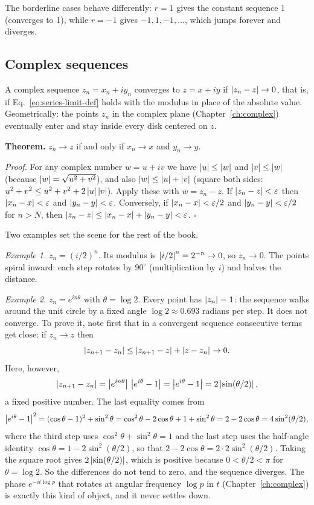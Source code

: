 The borderline cases behave differently: $r=1$ gives the constant sequence $1$ (converges to 1), while $r=-1$ gives $-1,1,-1,\dots$, which jumps forever and diverges.

\subsection{Complex sequences}

A complex sequence $z_n=x_n+iy_n$ converges to $z=x+iy$ if $\left\lvert z_n-z\right\rvert\to0$, that is, if Eq.~\eqref{eq:series-limit-def} holds with the modulus in place of the absolute value. Geometrically: the points $z_n$ in the complex plane (Chapter~\ref{ch:complex}) eventually enter and stay inside every disk centered on $z$.

\textbf{Theorem.} $z_n\to z$ if and only if $x_n\to x$ and $y_n\to y$.

\emph{Proof.} For any complex number $w=u+iv$ we have $\left\lvert u\right\rvert\le\left\lvert w\right\rvert$ and $\left\lvert v\right\rvert\le\left\lvert w\right\rvert$ (because $\left\lvert w\right\rvert=\sqrt{u^2+v^2}$), and also $\left\lvert w\right\rvert\le\left\lvert u\right\rvert+\left\lvert v\right\rvert$ (square both sides: $u^2+v^2\le u^2+v^2+2\left\lvert u\right\rvert\left\lvert v\right\rvert$). Apply these with $w=z_n-z$. If $\left\lvert z_n-z\right\rvert<\varepsilon$ then $\left\lvert x_n-x\right\rvert<\varepsilon$ and $\left\lvert y_n-y\right\rvert<\varepsilon$. Conversely, if $\left\lvert x_n-x\right\rvert<\varepsilon/2$ and $\left\lvert y_n-y\right\rvert<\varepsilon/2$ for $n>N$, then $\left\lvert z_n-z\right\rvert\le\left\lvert x_n-x\right\rvert+\left\lvert y_n-y\right\rvert<\varepsilon$. $\square$

Two examples set the scene for the rest of the book.

\emph{Example 1.} $z_n=(i/2)^n$. Its modulus is $\left\lvert i/2\right\rvert^n=2^{-n}\to0$, so $z_n\to0$. The points spiral inward: each step rotates by $90^\circ$ (multiplication by $i$) and halves the distance.

\emph{Example 2.} $z_n=e^{in\theta}$ with $\theta=\log2$. Every point has $\left\lvert z_n\right\rvert=1$: the sequence walks around the unit circle by a fixed angle $\log 2\approx0.693$ radians per step. It does not converge. To prove it, note first that in a convergent sequence consecutive terms get close: if $z_n\to z$ then
\[
\left\lvert z_{n+1}-z_n\right\rvert\le\left\lvert z_{n+1}-z\right\rvert+\left\lvert z-z_n\right\rvert\to0 .
\]
Here, however,
\[
\left\lvert z_{n+1}-z_n\right\rvert=\left\lvert e^{in\theta}\right\rvert\,\left\lvert e^{i\theta}-1\right\rvert=\left\lvert e^{i\theta}-1\right\rvert=2\left\lvert \sin(\theta/2)\right\rvert,
\]
a fixed positive number. The last equality comes from
\[
\left\lvert e^{i\theta}-1\right\rvert^2=(\cos\theta-1)^2+\sin^2\theta=\cos^2\theta-2\cos\theta+1+\sin^2\theta=2-2\cos\theta=4\sin^2(\theta/2),
\]
where the third step uses $\cos^2\theta+\sin^2\theta=1$ and the last step uses the half-angle identity $\cos\theta=1-2\sin^2(\theta/2)$, so that $2-2\cos\theta=2\cdot2\sin^2(\theta/2)$. Taking the square root gives $2\left\lvert \sin(\theta/2)\right\rvert$, which is positive because $0<\theta/2<\pi$ for $\theta=\log2$. So the differences do not tend to zero, and the sequence diverges. The phase $e^{-it\log p}$ that rotates at angular frequency $\log p$ in $t$ (Chapter~\ref{ch:complex}) is exactly this kind of object, and it never settles down.

